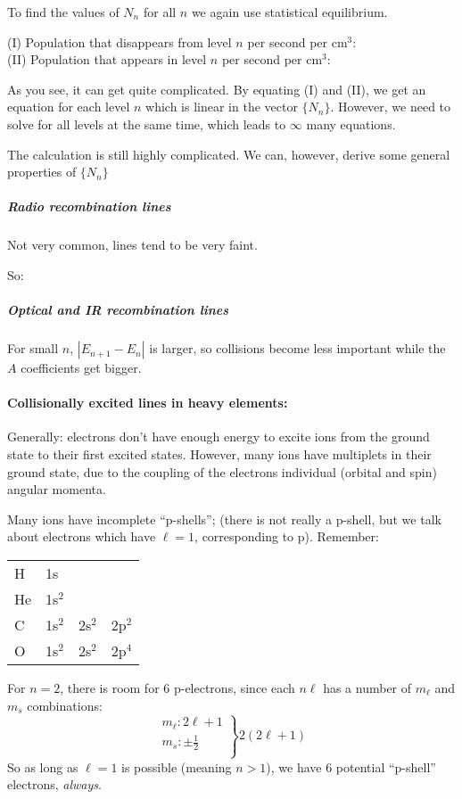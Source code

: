 \documentclass[11pt]{article}
\newcommand{\mar}[1]{\hspace{0pt}\marginpar{-\textcolor{black}{#1}-}}
\begin{document}
To find the values of $N_{n}$ for all $n$ we again use statistical equilibrium.

(I) Population that disappears from level $n$ per second per cm$^{3}$:
\[
    \]
(II) Population that appears in level $n$ per second per cm$^{3}$:
\[
    \]

As you see, it can get quite complicated. By equating (I) and (II), we
get an equation for each level $n$ which is linear in the vector
$\{ N_{n} \}$. However, we need to solve for all levels at the same time,
which leads to $\infty$ many equations.


\mar{71}The calculation is still highly complicated. We can, however,
derive some general properties of $\{N_{n}\}$

\subparagraph{Radio recombination lines}
Not very common, lines tend to be very faint.

\mar{72}So:
\[
    \]

\subparagraph{Optical and IR recombination lines}
For small $n$, $|E_{n+1} - E_{n}|$ is larger, so collisions become
less important while the $A$ coefficients get bigger.


\paragraph{Collisionally excited lines in heavy elements:}
\mar{79}Generally: electrons don't have enough energy to excite ions from
the ground state to their first excited states. However, many
ions have multiplets in their ground state, due to the coupling of
the electrons individual (orbital and spin) angular momenta.

Many ions have incomplete ``p-shells''; (there is not really a p-shell,
but we talk about electrons which have $\ell = 1$, corresponding to p).
Remember:

\begin{tabular}{l l l l}
    H & 1s\\
    He & 1s$^{2}$\\
    C & 1s$^{2}$ & 2s$^{2}$ & 2p$^{2}$\\
    O & 1s$^{2}$ & 2s$^{2}$ & 2p$^{4}$
\end{tabular}
For $n=2$, there is room for 6 p-electrons, since each $n\ell$ has
a number of $m_{\ell}$ and $m_{s}$ combinations:
\begin{equation*}
    \left.
        \begin{array}{l}
            m_{\ell}: 2\ell+1\\
            m_{s}: \pm \frac{1}{2}\\
        \end{array}
    \right\} 2(2\ell+1)
\end{equation*}
So as long as $\ell=1$ is possible (meaning $n>1$), we have 6 potential
``p-shell'' electrons, \emph{always}.
\end{document}
